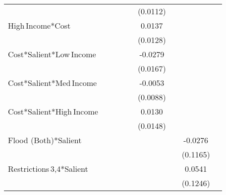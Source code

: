 {\begin{tabular}{l*{8}{c}}
                &                  &                  &                  &                  & (0.0112)         &                  &                  &                  \\
High\,Income*Cost&                  &                  &                  &                  &   0.0137         &                  &                  &                  \\
                &                  &                  &                  &                  & (0.0128)         &                  &                  &                  \\
Cost*Salient*Low\,Income&                  &                  &                  &                  &  -0.0279\sym{*}  &                  &                  &                  \\
                &                  &                  &                  &                  & (0.0167)         &                  &                  &                  \\
Cost*Salient*Med\,Income&                  &                  &                  &                  &  -0.0053         &                  &                  &                  \\
                &                  &                  &                  &                  & (0.0088)         &                  &                  &                  \\
Cost*Salient*High\,Income&                  &                  &                  &                  &   0.0130         &                  &                  &                  \\
                &                  &                  &                  &                  & (0.0148)         &                  &                  &                  \\
Flood (Both)*Salient&                  &                  &                  &                  &                  &                  &  -0.0276         &                  \\
                &                  &                  &                  &                  &                  &                  & (0.1165)         &                  \\
Restrictions\,3,4*Salient&                  &                  &                  &                  &                  &                  &   0.0541         &                  \\
                &                  &                  &                  &                  &                  &                  & (0.1246)         &                  \\

\end{tabular}}
